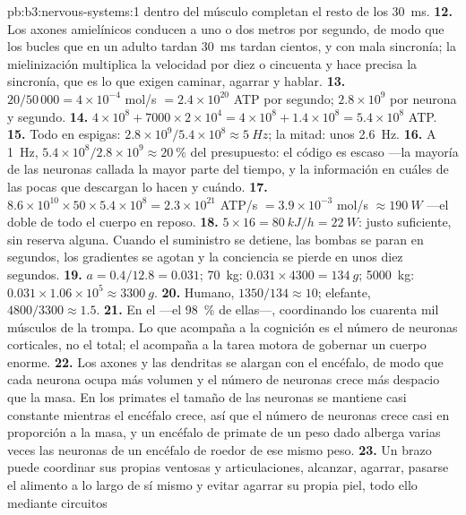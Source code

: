 \begin{solution}{pb:b3:nervous-systems:1}
dentro del músculo completan el resto de los \qty{30}{ms}.
\textbf{12.} Los axones amielínicos conducen a uno o dos metros por
segundo, de modo que los bucles que en un adulto tardan \qty{30}{ms}
tardan cientos, y con mala sincronía; la mielinización multiplica la
velocidad por diez o cincuenta y hace precisa la sincronía, que es lo
que exigen caminar, agarrar y hablar.
\textbf{13.} $20/50\,000 = 4\times 10^{-4}$ mol/s $= 2.4\times 10^{20}$
ATP por segundo; $2.8\times 10^{9}$ por neurona y segundo.
\textbf{14.} $4\times 10^{8} + 7000\times 2\times 10^{4} = 4\times 10^{8}
+ 1.4\times 10^{8} = 5.4\times 10^{8}$ ATP.
\textbf{15.} Todo en espigas: $2.8\times 10^{9}/5.4\times 10^{8} \approx
\qty{5}{Hz}$; la mitad: unos \qty{2.6}{Hz}.
\textbf{16.} A \qty{1}{Hz}, $5.4\times 10^{8}/2.8\times 10^{9} \approx
\qty{20}{\%}$ del presupuesto: el código es escaso ---la mayoría de las
neuronas callada la mayor parte del tiempo, y la información en cuáles
de las pocas que descargan lo hacen y cuándo.
\textbf{17.} $8.6\times 10^{10}\times 50\times 5.4\times 10^{8} = 2.3
\times 10^{21}$ ATP/s $= 3.9\times 10^{-3}$ mol/s $\approx \qty{190}{W}$
---el doble de todo el cuerpo en reposo.
\textbf{18.} $5\times 16 = \qty{80}{kJ/h} = \qty{22}{W}$: justo
suficiente, sin reserva alguna. Cuando el suministro se detiene, las
bombas se paran en segundos, los gradientes se agotan y la conciencia
se pierde en unos diez segundos.
\textbf{19.} $a = 0.4/12.8 = 0.031$; \qty{70}{kg}: $0.031\times 4300 =
\qty{134}{g}$; \qty{5000}{kg}: $0.031\times 1.06\times 10^{5} \approx
\qty{3300}{g}$.
\textbf{20.} Humano, $1350/134 \approx 10$; elefante, $4800/3300 \approx
1.5$.
\textbf{21.} En el  ---el \qty{98}{\%} de ellas---, coordinando
los cuarenta mil músculos de la trompa. Lo que acompaña a la cognición
es el número de neuronas corticales, no el total; el  acompaña
a la tarea motora de gobernar un cuerpo enorme.
\textbf{22.} Los axones y las dendritas se alargan con el encéfalo, de
modo que cada neurona ocupa más volumen y el número de neuronas crece
más despacio que la masa. En los primates el tamaño de las neuronas se
mantiene casi constante mientras el encéfalo crece, así que el número
de neuronas crece casi en proporción a la masa, y un encéfalo de
primate de un peso dado alberga varias veces las neuronas de un
encéfalo de roedor de ese mismo peso.
\textbf{23.} Un brazo puede coordinar sus propias ventosas y
articulaciones, alcanzar, agarrar, pasarse el alimento a lo largo de sí
mismo y evitar agarrar su propia piel, todo ello mediante circuitos

\end{solution}
